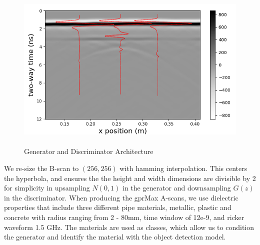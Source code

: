 \begin{figure}[H]
  \centering
  \includegraphics[width=1.0\linewidth]{figures/originalBScan.png}
  
  \caption{\\Generator and Discriminator Architecture}
  \label{fig:originalBscan}
\end{figure}

\hspace{0.5in}We re-size the B-scan to $(256,256)$ with hamming interpolation. This centers the hyperbola, and ensures the the height and width dimensions are divisible by 2 for simplicity in upsampling $N(0,1)$ in the generator and downsampling $G(z)$ in the discriminator. When producing the gprMax A-scans, we use dielectric properties that include three different pipe materials, metallic, plastic and concrete with radius ranging from 2 - 80mm, time window of 12e-9, and ricker waveform 1.5 GHz. The materials are used as classes, which allow us to condition the generator and identify the material with the object detection model.
\vspace{0.5\baselineskip}

